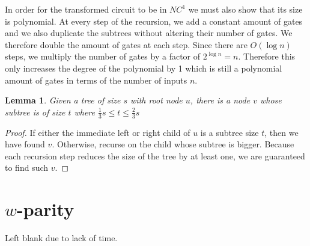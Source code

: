 \documentclass{article}
\newtheorem{lemma}{Lemma}
\begin{document}
In order for the transformed circuit to be in $NC^1$ we must also show that its size is polynomial. At every step of the recursion, we add a constant amount of gates and we also duplicate the subtrees without altering their number of gates. We therefore double the amount of gates at each step. Since there are $O(\log n)$ steps, we multiply the number of gates by a factor of $2^{\log n}=n$. Therefore this only increases the degree of the polynomial by 1 which is still a polynomial amount of gates in terms of the number of inputs $n$.

\begin{lemma}\label{lemma:subtree}
Given a tree of size $s$ with root node $u$, there is a node $v$ whose subtree is of size $t$ where $\frac{1}{3}s\leq t \leq \frac{2}{3}s$
\end{lemma}
\begin{proof}
If either the immediate left or right child of $u$ is a subtree size $t$, then we have found $v$. Otherwise, recurse on the child whose subtree is bigger. Because each recursion step reduces the size of the tree by at least one, we are guaranteed to find such $v$.
\end{proof}


\section{$w$-parity}

Left blank due to lack of time.
\end{document}
